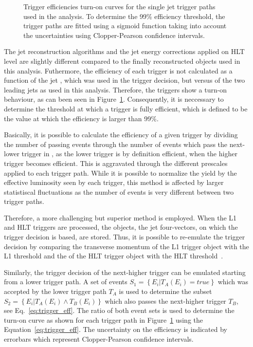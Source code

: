 \begin{figure}[htbp]
    \caption[Turn-on curves of single jet HLT trigger paths]{Trigger efficiencies turn-on curves for the single jet trigger
    paths used in the analysis. To determine the 99\% efficiency threshold, the
    trigger paths are fitted using a sigmoid function taking into account the
    uncertainties using Clopper-Pearson confidence intervals.}
    \label{fig:trigger_eff}
\end{figure}

The jet reconstruction algorithms and the jet energy corrections applied on HLT
level are slightly different compared to the finally reconstructed objects used
in this analysis. Futhermore, the efficiency of each trigger is not calculated
as a function of the jet \pt, which was used in the trigger decision, but versus
\ptavg of the two leading jets as used in this analysis. Therefore, the triggers
show a turn-on behaviour, as can been seen in Figure~\ref{fig:trigger_eff}.
Consequently, it is neccessary to determine the threshold at which a trigger is
fully efficient, which is defined to be the value at which the efficiency is
larger than 99\%.

Basically, it is possible to calculate the efficiency of a given trigger by
dividing the number of passing events through the number of events which pass
the next-lower trigger in \pt, as the lower trigger is by definition efficient,
when the higher trigger becomes efficient. This is aggravated through the
different prescales applied to each trigger path. While it is possible to
normalize the yield by the effective luminosity seen by each trigger, this
method is affected by larger statistiscal fluctuations as the number of events
is very different between two trigger paths.

Therefore, a more challenging but superior method is employed. When the L1
and HLT triggers are processed, the objects, \ie the jet four-vectors, on
which the trigger decision is based, are stored. Thus, it is possible to
re-emulate the trigger decision by comparing the transverse momentum of the L1
trigger object  with the L1 threshold and the \pt of the HLT trigger object with
the HLT threshold~\cite{Stober:2012abc}.

Similarly, the trigger decision of the next-higher trigger can be emulated
starting from a lower trigger path. A set of events $S_1 = \left\{E_i | T_A
(E_i) = true \right\}$ which was accepted  by the lower trigger path $T_A$ is
used to determine the subset $S_2 = \left\{E_i|T_A(E_i) \wedge  T_B(E_i)
\right\}$ which also passes the next-higher trigger $T_B$, see
Eq.~\ref{eq:trigger_eff}. The ratio of both event sets is used to determine
the turn-on curve as shown for each trigger path in Figure~\ref{fig:trigger_eff}
using the Equation~\ref{eq:trigger_eff}. The uncertainty on the efficiency is
indicated by errorbars which represent Clopper-Pearson confidence intervals.

